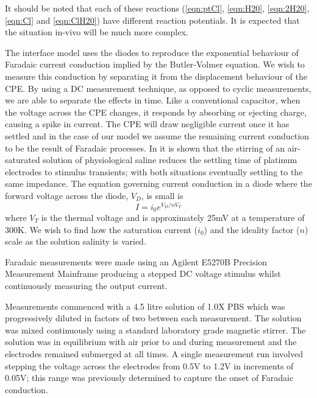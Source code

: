 \documentclass[journal, a4paper]{IEEEtran}
\begin{document}
{
    \color{blue}
    It should be noted that each of these reactions (\ref{eqn:ptCl}, \ref{eqn:H20}, \ref{eqn:2H20}, \ref{eqn:Cl} and \ref{eqn:ClH20}) have different reaction potentials. It is expected that the situation in-vivo will be much more complex.
}

The interface model uses the diodes to reproduce the exponential behaviour of Faradaic current conduction implied by the Butler-Volmer equation. We wish to measure this conduction by separating it from the displacement behaviour of the CPE. By using a DC measurement technique, as opposed to cyclic measurements, we are able to separate the effects in time.
Like a conventional capacitor, when the voltage across the CPE changes, it responds by absorbing or ejecting charge, causing a spike in current. The CPE will draw negligible current once it has settled and in the case of our model we assume the remaining current conduction to be the result of Faradaic processes.
In \cite{Greatbatch1969} it is shown that the stirring of an air-saturated solution of physiological saline reduces the settling time of platinum electrodes to stimulus transients; with both situations eventually settling to the same impedance.
The equation governing current conduction in a diode where the forward voltage across the diode, $V_{D}$, is small is
\begin{equation}
    I = i_{0}  e^{V_{D} / n V_{T}}
\end{equation}
where $V_{T}$ is the thermal voltage and is approximately 25\thinspace mV at a temperature of 300\thinspace K. We wish to find how the saturation current ($i_{0}$) and the ideality factor ($n$) scale as the solution salinity is varied.

Faradaic measurements were made using an Agilent E5270B Precision Measurement Mainframe producing a stepped DC voltage stimulus whilst continuously measuring the output current.

Measurements commenced with a 4.5 litre solution of 1.0X PBS which was progressively diluted in factors of two between each measurement. The solution was mixed continuously using a standard laboratory grade magnetic stirrer. The solution was in equilibrium with air prior to and during measurement and the electrodes remained submerged at all times.
A single measurement run involved stepping the voltage across the electrodes from 0.5\thinspace V to 1.2\thinspace V in increments of 0.05\thinspace V; this range was previously determined to capture the onset of Faradaic conduction.
\end{document}
